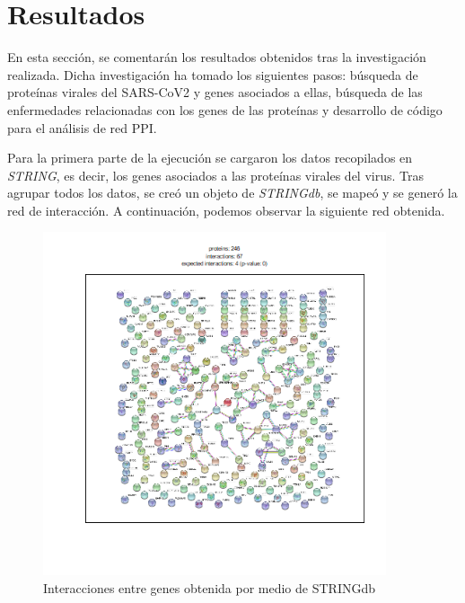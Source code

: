 \section{Resultados}

En esta sección, se comentarán los resultados obtenidos tras la investigación realizada. Dicha investigación ha tomado los siguientes pasos: búsqueda de proteínas virales del SARS-CoV2 y genes asociados a ellas, búsqueda de las enfermedades relacionadas con los genes de las proteínas y desarrollo de código para el análisis de red PPI.

\newline

Para la primera parte de la ejecución se cargaron los datos recopilados en \textit{STRING}, es decir, los genes asociados a las proteínas virales del virus. Tras agrupar todos los datos, se creó un objeto de \textit{STRINGdb}, se mapeó y se generó la red de interacción. A continuación, podemos observar la siguiente red obtenida.

\newline

\begin{figure}[h!]
	\includegraphics[width=0.9\textwidth]{figures/figuraSTRINGdb.png}
	\caption{Interacciones entre genes obtenida por medio de STRINGdb}
	\label{fig:red_stringdb}
\end{figure}

\newline

